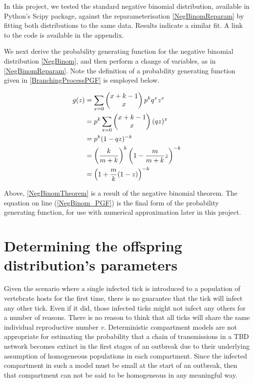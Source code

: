 \documentclass[hidelinks]{article}
\begin{document}
In this project, we tested the standard negative binomial distribution, available in Python's Scipy package, against the reparameterisation \eqref{NegBinomReparam} by fitting both distributions to the same data. Results indicate a similar fit. A link to the code is available in the appendix.

We next derive the probability generating function for the negative binomial distribution \eqref{NegBinom}, and then perform a change of variables, as in \eqref{NegBinomReparam}. Note the definition of a probability generating function given in \eqref{BranchingProcessPGF} is employed below.

\begin{align}
	g(z) &= \sum_{x=0} \left(\begin{matrix}x+k-1 \\ x  \end{matrix}\right) \space p^k q^x z^x \nonumber \\ 
	     &= p^k \sum_{x=0} \left(\begin{matrix}x+k-1 \\ x \end{matrix}\right) \space (qz)^x \nonumber \\
	     &= p^k (1-qz)^{-k} \label{NegBinomTheorem} \\
	     &= \left(\frac{k}{m+k}\right)^k \left(1-\frac{m}{m+k}z\right)^{-k} \nonumber \\ 
	     &= \left(1 + \frac{m}{k}(1-z)\right)^{-k} \label{NegBinom_PGF}
\end{align}

Above, \eqref{NegBinomTheorem} is a result of the negative binomial theorem. The equation on line (\ref{NegBinom_PGF}) is the final form of the probability generating function, for use with numerical approximation later in this project.

\newpage

\section{Determining the offspring distribution's parameters}

Given the scenario where a single infected tick is introduced to a population of vertebrate hosts for the first time, there is no guarantee that the tick will infect any other tick. Even if it did, those infected ticks might not infect any others for a number of reasons. There is no reason to think that all ticks will share the same individual reproductive number $ v $. Deterministic compartment models are not appropriate for estimating the probability that a chain of transmissions in a TBD network becomes extinct in the first stages of an outbreak due to their underlying assumption of homogeneous populations in each compartment. Since the infected compartment in such a model must be small at the start of an outbreak, then that compartment can not be said to be homogeneous in any meaningful way.
\end{document}
